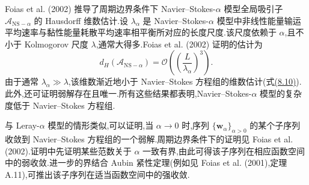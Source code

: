 \begin{note}
\label{note:navier-stokes-alpha-attractor-dimension}
Foias et al. (2002) 推导了周期边界条件下 Navier--Stokes-$\alpha$ 模型全局吸引子 $\mathcal{A}_{\mathrm{NS}-\alpha}$ 的 Hausdorff 维数估计.设 $\lambda_\alpha$ 是 Navier--Stokes-$\alpha$ 模型中非线性能量输运平均速率与黏性能量耗散平均速率相平衡所对应的长度尺度.该尺度依赖于 $\alpha$,且不小于 Kolmogorov 尺度 $\lambda$,通常大得多.Foias et al. (2002) 证明的估计为
\[
 d_H(\mathcal{A}_{\mathrm{NS}-\alpha})
 =\mathcal{O}\!\left(\left(\frac{L}{\lambda_\alpha}\right)^3\right).
\]
由于通常 $\lambda_\alpha\gg\lambda$,该维数渐近地小于 Navier--Stokes 方程组的维数估计(式\hyperref[eq:hausdorff-dimension-three-dimensional-invariant-set]{(8.10)}).此外,还可证明弱解存在且唯一.所有这些结果都表明,Navier--Stokes-$\alpha$ 模型的复杂度低于 Navier--Stokes 方程组.
\end{note}

\begin{note}
\label{note:navier-stokes-alpha-convergence-alpha-zero}
与 Leray-$\alpha$ 模型的情形类似,可以证明,当 $\alpha\to0$ 时,序列 $\{\bm{w}_\alpha\}_{\alpha>0}$ 的某个子序列收敛到 Navier--Stokes 方程组的一个弱解.周期边界条件下的证明见 Foias et al. (2002).证明中先证明某些范数关于 $\alpha$ 一致有界,由此可得该子序列在相应函数空间中的弱收敛.进一步的界结合 Aubin 紧性定理(例如见 Foias et al. (2001),定理 A.11),可推出该子序列在适当函数空间中的强收敛.
\end{note}

